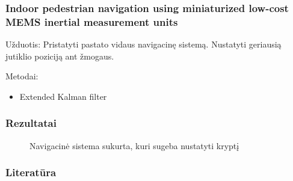 \documentclass{beamer}
\begin{document}
    \begin{frame}   
        \frametitle{Indoor pedestrian navigation using miniaturized low-cost MEMS inertial measurement units \cite{yuan2014indoor}}

        Užduotis: Pristatyti pastato vidaus navigacinę sistemą. Nustatyti geriausią jutiklio poziciją ant žmogaus.

        Metodai:
        \begin{itemize}
            \item Extended Kalman filter
        \end{itemize}

    \end{frame}

    \begin{frame}
        \frametitle{Rezultatai}

        \begin{figure}[H]
            \caption{Navigacinė sistema sukurta, kuri sugeba nustatyti kryptį}
        \end{figure}
    \end{frame}

    \begin{frame}[allowframebreaks]
        \frametitle{Literatūra}
        
        
        
    \end{frame}
\end{document}
